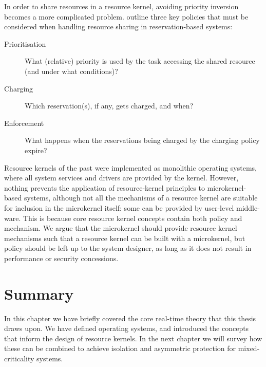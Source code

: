 \label{p:resource-kernel-resource-sharing}
In order to share resources in a resource kernel, avoiding priority inversion becomes a more
complicated problem.  \citet{deNiz_LSR_01} outline three key policies that must be considered when
handling resource sharing in reservation-based systems:

\begin{description}
    \item[Prioritisation] What (relative) priority is used by the task accessing the shared resource (and under what conditions)?
    \item[Charging] Which reservation(s), if any, gets charged, and when?
    \item[Enforcement] What happens when the reservations being charged by the charging policy expire?
\end{description}

Resource kernels of the past were implemented as monolithic operating systems, where all system services
and drivers are provided by the kernel. However, nothing prevents the application of resource-kernel
principles to microkernel-based systems, although not all the mechanisms of a resource kernel are
suitable for inclusion in the microkernel itself: some can be provided by user-level middle-ware.  This
is because core resource kernel concepts contain both policy and mechanism.  We argue that the
microkernel should provide resource kernel mechanisms such that a resource kernel can be built with
a microkernel, but policy should be left up to the system designer, as long as it does not result in
performance or security concessions.

\section{Summary}

In this chapter we have briefly covered the core real-time theory that this thesis draws upon.
We have defined operating systems, and introduced the concepts that inform the design of resource kernels.
In the next chapter we will survey how these can be combined to achieve isolation and asymmetric protection for mixed-criticality systems.
